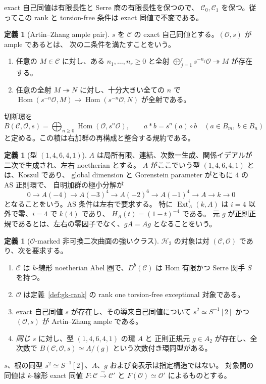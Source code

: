 \documentclass[a4paper,11pt]{ltjsarticle}
\numberwithin{equation}{section}
\theoremstyle{plain}
\theoremstyle{definition}
\newtheorem{definition}[theorem]{定義}
\theoremstyle{remark}
\newcommand{\OO}{\mathcal O}
\newcommand{\cC}{\mathcal C}
\newcommand{\HH}{\mathcal H_2}
\DeclareMathOperator{\Hom}{Hom}
\DeclareMathOperator{\Ext}{Ext}
\begin{document}
exact 自己同値は有限長性と Serre 商の有限長性を保つので、
$\cC_0,\cC_1$ を保つ。従ってこの rank と torsion-free 条件は exact 同値で不変である。

\begin{definition}[Artin--Zhang ample pair]
\label{def:ample}
$s$ を $\cC$ の exact 自己同値とする。$(\OO,s)$ が ample であるとは、
次の二条件を満たすことをいう。
\begin{enumerate}[label=(A\arabic*)]
\item 任意の $M\in\cC$ に対し、ある $n_1,\ldots,n_r\ge0$ と全射
      $\bigoplus_{j=1}^r s^{-n_j}\OO\twoheadrightarrow M$ が存在する。
\item 任意の全射 $M\twoheadrightarrow N$ に対し、十分大きい全ての $n$ で
      $\Hom(s^{-n}\OO,M)\to\Hom(s^{-n}\OO,N)$ が全射である。
\end{enumerate}
切断環を
\[
 B(\cC,\OO,s)=\bigoplus_{n\ge0}\Hom(\OO,s^n\OO),
 \qquad a*b=s^n(a)\circ b\quad(a\in B_m,\ b\in B_n)
\]
と定める。この積は右加群の再構成と整合する規約である。
\end{definition}

\begin{definition}[型 $(1,4,6,4,1)$]
\label{def:as14641}
$A$ は局所有限、連結、次数一生成、関係イデアルが二次で生成され、左右 noetherian とする。
$A$ がここでいう型 $(1,4,6,4,1)$ とは、Koszul であり、
global dimension と Gorenstein parameter がともに $4$ の AS 正則環で、
自明加群の極小分解が
\[
 0\to A(-4)\to A(-3)^4\to A(-2)^6\to A(-1)^4\to A\to k\to0
\]
となることをいう。AS 条件は左右で要求する。
特に $\Ext_A^i(k,A)$ は $i=4$ 以外で零、$i=4$ で $k(4)$ であり、
$H_A(t)=(1-t)^{-4}$ である。
元 $g$ が正則正規であるとは、左右の零因子でなく、$gA=Ag$ となることをいう。
\end{definition}

\begin{definition}[$\OO$-marked 非可換二次曲面の強いクラス]
\label{def:h2}
$\HH$ の対象は対 $(\cC,\OO)$ であり、次を要求する。
\begin{enumerate}[label=(Q\arabic*)]
\item $\cC$ は $k$-線形 noetherian Abel 圏で、$D^b(\cC)$ は Hom 有限かつ
      Serre 関手 $S$ を持つ。
\item $\OO$ は定義~\ref{def:gk-rank} の rank one torsion-free exceptional 対象である。
\item exact 自己同値 $s$ が存在し、その導来自己同値について
      $s^2\simeq S^{-1}[2]$ かつ $(\OO,s)$ が Artin--Zhang ample である。
\item \emph{同じ $s$} に対し、型 $(1,4,6,4,1)$ の環 $A$ と
      正則正規元 $g\in A_2$ が存在し、全次数で
      $B(\cC,\OO,s)\simeq A/(g)$ という次数付き環同型がある。
\end{enumerate}
$s$、根の同型 $s^2\simeq S^{-1}[2]$、$A$、$g$ および商表示は指定構造ではない。
対象間の同値は $k$-線形 exact 同値 $F:\cC\xrightarrow{\sim}\cC'$ と
$F(\OO)\simeq\OO'$ によるものとする。
\end{definition}
\end{document}
